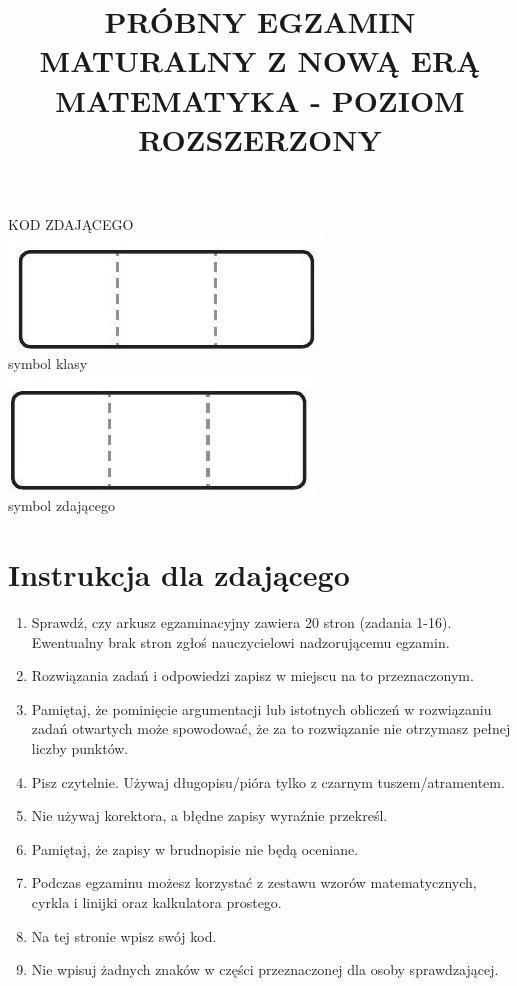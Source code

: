 \documentclass[10pt]{article}
\title{PRÓBNY EGZAMIN MATURALNY Z NOWĄ ERĄ MATEMATYKA - POZIOM ROZSZERZONY }
\author{}
\date{}
\begin{document}
\maketitle
KOD ZDAJĄCEGO\\
\includegraphics[max width=\textwidth, center]{2024_11_21_5abc0108fbbc287103ecg-01(1)}\\
symbol klasy\\
\includegraphics[max width=\textwidth, center]{2024_11_21_5abc0108fbbc287103ecg-01}\\
symbol zdającego

\section*{Instrukcja dla zdającego}
\begin{enumerate}
  \item Sprawdź, czy arkusz egzaminacyjny zawiera 20 stron (zadania 1-16). Ewentualny brak stron zgłoś nauczycielowi nadzorującemu egzamin.
  \item Rozwiązania zadań i odpowiedzi zapisz w miejscu na to przeznaczonym.
  \item Pamiętaj, że pominięcie argumentacji lub istotnych obliczeń w rozwiązaniu zadań otwartych może spowodować, że za to rozwiązanie nie otrzymasz pełnej liczby punktów.
  \item Pisz czytelnie. Używaj długopisu/pióra tylko z czarnym tuszem/atramentem.
  \item Nie używaj korektora, a błędne zapisy wyraźnie przekreśl.
  \item Pamiętaj, że zapisy w brudnopisie nie będą oceniane.
  \item Podczas egzaminu możesz korzystać z zestawu wzorów matematycznych, cyrkla i linijki oraz kalkulatora prostego.
  \item Na tej stronie wpisz swój kod.
  \item Nie wpisuj żadnych znaków w części przeznaczonej dla osoby sprawdzającej.
\end{enumerate}
\end{document}
